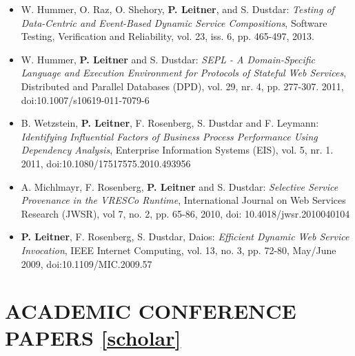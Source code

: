 \documentclass[paper=letter,fontsize=11pt]{scrartcl} %
\newcommand{\NewPart}[2]{\section*{\uppercase{#1} #2}}
\begin{document}
\begin{itemize}
  \item W. Hummer, O. Raz, O. Shehory, \textbf{P. Leitner}, and S. Dustdar: \emph{Testing of Data-Centric and Event-Based Dynamic Service Compositions}, Software Testing, Verification and Reliability, vol. 23, iss. 6, pp. 465-497, 2013.
\item W. Hummer, \textbf{P. Leitner} and S. Dustdar: \emph{SEPL - A
Domain-Specific Language and Execution Environment for Protocols of Stateful Web
Services}, Distributed and Parallel Databases (DPD), vol. 29, nr. 4, pp.
277-307. 2011, doi:10.1007/s10619-011-7079-6
\item B. Wetzstein, \textbf{P. Leitner}, F. Rosenberg, S. Dustdar and F. Leymann: \emph{Identifying Influential Factors of Business Process Performance Using Dependency Analysis}, Enterprise Information Systems (EIS), vol. 5, nr. 1. 2011, doi:10.1080/17517575.2010.493956
\item A. Michlmayr, F. Rosenberg, \textbf{P. Leitner} and S. Dustdar: \emph{Selective Service Provenance in the VRESCo Runtime}, International Journal on Web Services Research (JWSR), vol 7, no. 2, pp. 65-86, 2010, doi: 10.4018/jwsr.2010040104
\item \textbf{P. Leitner}, F. Rosenberg, S. Dustdar, Daios: \emph{Efficient Dynamic Web Service Invocation}, IEEE Internet Computing, vol. 13, no. 3, pp. 72-80, May/June 2009, doi:10.1109/MIC.2009.57
\end{itemize}

\NewPart{Academic Conference Papers}{\href{https://scholar.google.ch/citations?user=wZ9f8CAAAAAJ}{[scholar]}}
\end{document}
